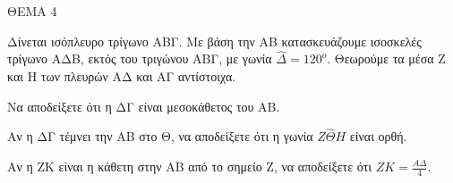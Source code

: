 
ΘΕΜΑ 4

Δίνεται ισόπλευρο τρίγωνο ΑΒΓ. Με βάση την ΑΒ κατασκευάζουμε ισοσκελές τρίγωνο ΑΔΒ, εκτός του τριγώνου ΑΒΓ, με γωνία $\widehat{\Delta} = 120^{ο}$. Θεωρούμε τα μέσα Ζ και Η των πλευρών ΑΔ και ΑΓ αντίστοιχα.

\begin{alist}
\item Να αποδείξετε ότι η ΔΓ είναι μεσοκάθετος του ΑΒ. 

\item Αν η ΔΓ τέμνει την ΑΒ στο Θ, να αποδείξετε ότι η γωνία $Ζ\widehat{\Theta}Η$ είναι ορθή. 

\item Αν η ΖΚ είναι η κάθετη στην ΑΒ από το σημείο Ζ, να αποδείξετε ότι $ΖΚ = \frac{Α\Delta}{4}$. 


\end{alist}
